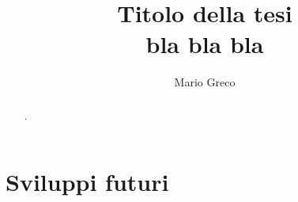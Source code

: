 \documentclass[LaM,binding=0.6cm]{sapthesis}
\title{Titolo della tesi \\ bla bla bla}
\author{Mario Greco}
\begin{document}
\onehalfspace 
\frontmatter

\maketitle

\dedication{Dedicato a\\}

\begin{abstract}
.
\end{abstract}

\begin{acknowledgments}

\end{acknowledgments}

\tableofcontents

% 
% 
% 
% 
% 
% 




\mainmatter







\chapter{Sviluppi futuri}

% 
% 
% 
\end{document}
